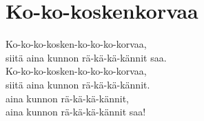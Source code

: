 \section{Ko-ko-koskenkorvaa}

Ko-ko-ko-kosken-ko-ko-ko-korvaa,\\
siitä aina kunnon rä-kä-kä-kännit saa.\\
Ko-ko-ko-kosken-ko-ko-ko-korvaa,\\
siitä aina kunnon rä-kä-kä-kännit.\\
aina kunnon rä-kä-kä-kännit,\\
aina kunnon rä-kä-kä-kännit saa!
